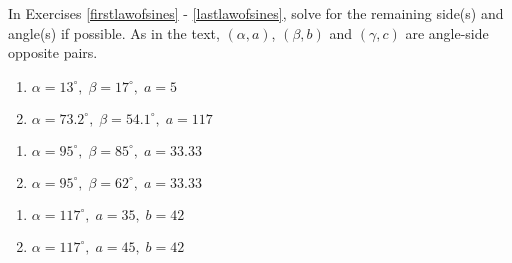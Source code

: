 \documentclass{ximera}
\begin{document}
	\author{Stitz-Zeager}


In Exercises \ref{firstlawofsines} - \ref{lastlawofsines}, solve for the remaining side(s) and angle(s) if possible.  As in the text, $(\alpha, a)$, $(\beta, b)$ and $(\gamma, c)$ are angle-side opposite pairs.

\begin{multicols}{2}

\begin{enumerate}

\item $\alpha = 13^{\circ}, \; \beta = 17^{\circ}, \; a = 5$ \label{firstlawofsines}
\item $\alpha = 73.2^{\circ}, \; \beta = 54.1^{\circ}, \; a = 117$

\setcounter{HW}{\value{enumi}}

\end{enumerate}

\end{multicols}

\begin{multicols}{2} 

\begin{enumerate}

\setcounter{enumi}{\value{HW}}

\item $\alpha = 95^{\circ}, \; \beta = 85^{\circ}, \; a = 33.33$
\item $\alpha = 95^{\circ}, \; \beta = 62^{\circ}, \; a = 33.33$

\setcounter{HW}{\value{enumi}}

\end{enumerate}

\end{multicols}

\begin{multicols}{2} 

\begin{enumerate}

\setcounter{enumi}{\value{HW}}

\item $\alpha = 117^{\circ}, \; a = 35, \; b = 42$
\item $\alpha = 117^{\circ}, \; a = 45, \; b = 42$

\setcounter{HW}{\value{enumi}}

\end{enumerate}

\end{multicols}
\end{document}
